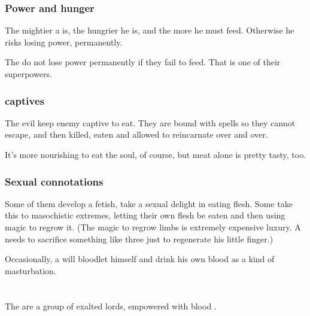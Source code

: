 \subsubsection{Power and hunger}
The mightier a \resphan{} is, the hungrier he is, and the more he must feed. Otherwise he risks losing power, permanently. 

The \Malachim{} do not lose power permanently if they fail to feed. That is one of their superpowers. 




\subsubsection{\Resphan{} captives}
The evil \resphain{} keep enemy \resphain{} captive to eat. 
They are bound with spells so they cannot escape, and then killed, eaten and allowed to reincarnate over and over. 

It's more nourishing to eat the soul, of course, but \resphan{} meat alone is pretty tasty, too. 





\subsubsection{Sexual connotations}
Some of them develop a  fetish, take a sexual delight in eating flesh. Some take this to masochistic extremes, letting their own flesh be eaten and then using magic to regrow it. (The magic to regrow limbs is extremely expensive luxury. A \resphan{} needs to sacrifice something like three \humans{} just to regenerate his little finger.) 

Occasionally, a \resphan{} will bloodlet himself and drink his own blood as a kind of masturbation.

















\section{\Satharioth}
The \satharioth{} are a group of exalted \resphan{} lords, empowered with \draconic{} blood . 

